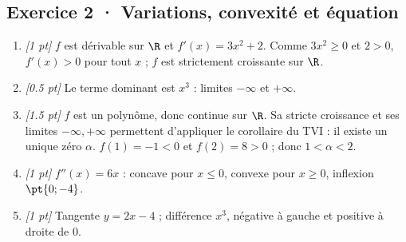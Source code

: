 \subsection*{Exercice 2 · Variations, convexité et équation}\begin{enumerate}

\item \textit{[1 pt]} $f$ est dérivable sur $\R$ et $f'(x)=3x^2+2$. Comme $3x^2\ge0$ et $2>0$, $f'(x)>0$ pour tout $x$ ; $f$ est strictement croissante sur $\R$.

\item \textit{[\num{0,5} pt]} Le terme dominant est $x^3$ : limites $-\infty$ et $+\infty$.

\item \textit{[\num{1,5} pt]} $f$ est un polynôme, donc continue sur $\R$. Sa stricte croissance et ses limites $-\infty,+\infty$ permettent d'appliquer le corollaire du TVI : il existe un unique zéro $\alpha$. $f(1)=-1<0$ et $f(2)=8>0$ ; donc $1<\alpha<2$.

\item \textit{[1 pt]} $f''(x)=6x$ : concave pour $x\le0$, convexe pour $x\ge0$, inflexion $\pt{0;-4}$.

\item \textit{[1 pt]} Tangente $y=2x-4$ ; différence $x^3$, négative à gauche et positive à droite de $0$.

\end{enumerate}

